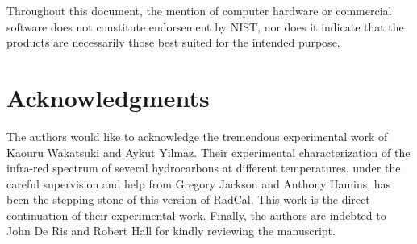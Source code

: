 \documentclass[11pt]{book}
\begin{document}
Throughout this document, the mention of computer hardware or commercial
software does not constitute endorsement by NIST, nor does it indicate that
the products are necessarily those best suited for the intended purpose.


\chapter{Acknowledgments}

The authors would like to acknowledge the tremendous experimental work of Kaouru Wakatsuki and Aykut Yilmaz. Their experimental characterization of the infra-red spectrum of several hydrocarbons at different temperatures, under the careful supervision and help from Gregory Jackson and Anthony Hamins, has been the stepping stone of this version of RadCal. This work is the direct continuation of their experimental work. Finally, the authors are indebted to John De Ris and Robert Hall for kindly reviewing the manuscript.

\newpage

\tableofcontents

\mainmatter











\end{document}
